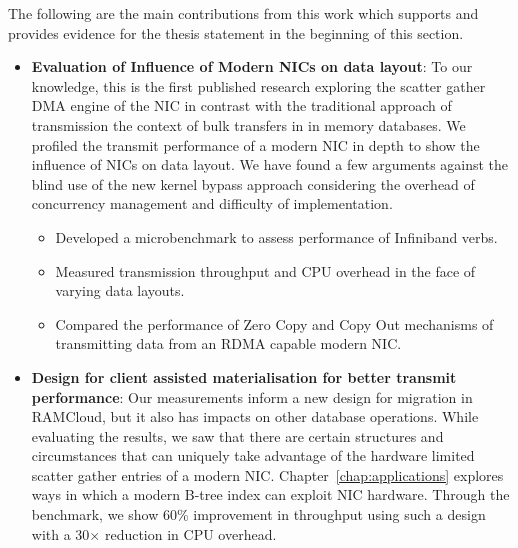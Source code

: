 The following are the main contributions from this work which supports and provides
evidence for the thesis statement in the beginning of this section.

\begin{itemize}

  \item{\textbf{Evaluation of Influence of Modern NICs on data layout}}: To our knowledge,
   this is the first published research exploring the scatter gather DMA engine of the NIC 
   in contrast with the traditional approach of transmission the context of bulk transfers in in memory databases. 
   We profiled the transmit performance of a modern NIC in depth to show the influence of NICs on data layout. 
   We have found a few arguments against the blind use of the new kernel bypass approach considering
   the overhead of concurrency management and difficulty of implementation.
   \begin{itemize}

    \item Developed a microbenchmark to assess performance of Infiniband verbs.

    \item Measured transmission throughput and CPU overhead in the face of varying
    data layouts.

    \item Compared the performance of Zero Copy and Copy Out mechanisms of \linebreak
    transmitting data from an RDMA capable modern NIC.
   \end{itemize} 

    \item{\textbf{Design for client assisted materialisation for better transmit performance}}: Our measurements inform a new design for migration in RAMCloud, but it also has impacts on other database operations.
     While evaluating the results, we saw that there are certain structures and circumstances that can uniquely take advantage of the hardware limited scatter gather entries of a modern NIC.
     Chapter~\ref{chap:applications} explores ways in which a modern B-tree index can exploit NIC hardware.
     Through the benchmark, we show 60\% improvement in throughput using such a design with a 30$\times$ reduction in CPU overhead.



\end{itemize}
